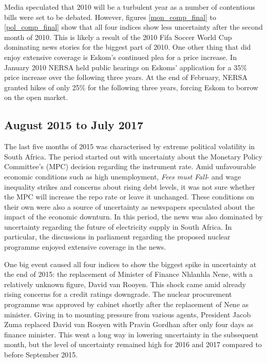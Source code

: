 \documentclass[11pt,preprint, authoryear]{elsarticle}
\numberwithin{equation}{section}
\numberwithin{figure}{section}
\numberwithin{table}{section}
\begin{document}
Media speculated that 2010 will be a turbulent year as a number of
contentious bills were set to be debated. However, figures
\ref{mon_comp_final} to \ref{pol_comp_final} show that all four indices
show less uncertainty after the second month of 2010. This is likely a
result of the 2010 Fifa Soccer World Cup dominating news stories for the
biggest part of 2010. One other thing that did enjoy extensive coverage
is Eskom's continued plea for a price increase. In January 2010 NERSA
held public hearings on Eskoms' application for a 35\% price increase
over the following three years. At the end of February, NERSA granted
hikes of only 25\% for the following three years, forcing Eskom to
borrow on the open market.

\subsection{August 2015 to July 2017}\label{august-2015-to-july-2017}

The last five months of 2015 was characterised by extreme political
volatility in South Africa. The period started out with uncertainty
about the Monetary Policy Committee's (MPC) decision regarding the
instrument rate. Amid unfavourable economic conditions such as high
unemployment, \emph{Fees must Fall}- and wage inequality strikes and
concerns about rising debt levels, it was not sure whether the MPC will
increase the repo rate or leave it unchanged. These conditions on their
own were also a source of uncertainty as newspapers speculated about the
impact of the economic downturn. In this period, the news was also
dominated by uncertainty regarding the future of electricity supply in
South Africa. In particular, the discussions in parliament regarding the
proposed nuclear programme enjoyed extensive coverage in the news.

One big event caused all four indices to show the biggest spike in
uncertainty at the end of 2015: the replacement of Minister of Finance
Nhlanhla Nene, with a relatively unknown figure, David van Rooyen. This
shock came amid already rising concerns for a credit ratings downgrade.
The nuclear procurement programme was approved by cabinet shortly after
the replacement of Nene as minister. Giving in to mounting pressure from
various agents, President Jacob Zuma replaced David van Rooyen with
Pravin Gordhan after only four days as finance minister. This went a
long way in lowering uncertainty in the subsequent month, but the level
of uncertainty remained high for 2016 and 2017 compared to before
September 2015.
\end{document}
